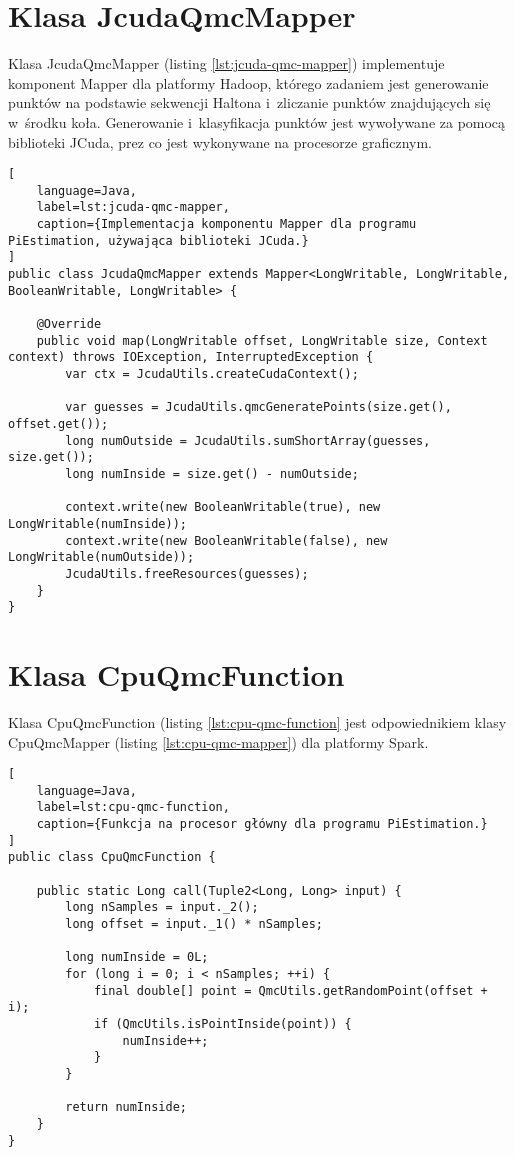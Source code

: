 \section*{Klasa JcudaQmcMapper} \label{ch:jcuda-qmc-mapper}

Klasa JcudaQmcMapper (listing \ref{lst:jcuda-qmc-mapper}) implementuje komponent Mapper dla
platformy Hadoop, którego zadaniem jest generowanie punktów na podstawie sekwencji Haltona
i~zliczanie punktów znajdujących się w~środku koła. Generowanie i~klasyfikacja punktów jest
wywoływane za pomocą biblioteki JCuda, prez co jest wykonywane na procesorze graficznym. 

\begin{lstlisting}[
    language=Java,
    label=lst:jcuda-qmc-mapper,
    caption={Implementacja komponentu Mapper dla programu PiEstimation, używająca biblioteki JCuda.}
]
public class JcudaQmcMapper extends Mapper<LongWritable, LongWritable, BooleanWritable, LongWritable> {

    @Override
    public void map(LongWritable offset, LongWritable size, Context context) throws IOException, InterruptedException {
        var ctx = JcudaUtils.createCudaContext();

        var guesses = JcudaUtils.qmcGeneratePoints(size.get(), offset.get());
        long numOutside = JcudaUtils.sumShortArray(guesses, size.get());
        long numInside = size.get() - numOutside;

        context.write(new BooleanWritable(true), new LongWritable(numInside));
        context.write(new BooleanWritable(false), new LongWritable(numOutside));
        JcudaUtils.freeResources(guesses);
    }
}
\end{lstlisting}
\newpage

\section*{Klasa CpuQmcFunction} \label{ch:cpu-qmc-function}

Klasa CpuQmcFunction (listing \ref{lst:cpu-qmc-function} jest odpowiednikiem klasy CpuQmcMapper
(listing \ref{lst:cpu-qmc-mapper}) dla platformy Spark.

\begin{lstlisting}[
    language=Java,
    label=lst:cpu-qmc-function,
    caption={Funkcja na procesor główny dla programu PiEstimation.}
]
public class CpuQmcFunction {

    public static Long call(Tuple2<Long, Long> input) {
        long nSamples = input._2();
        long offset = input._1() * nSamples;

        long numInside = 0L;
        for (long i = 0; i < nSamples; ++i) {
            final double[] point = QmcUtils.getRandomPoint(offset + i);
            if (QmcUtils.isPointInside(point)) {
                numInside++;
            }
        }

        return numInside;
    }
}
\end{lstlisting}
\newpage


